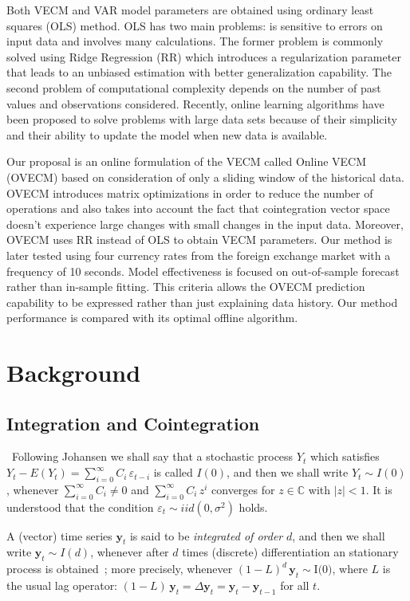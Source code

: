 \documentclass[twocolumn]{svjour3}          %
\begin{document}
Both VECM and VAR model parameters are obtained using ordinary least squares
(OLS) method. OLS has two main problems: is sensitive to errors on input data
and involves many calculations. The former problem is commonly solved using
Ridge Regression (RR) \cite{hoerl1970} which introduces a regularization
parameter that leads to an unbiased estimation with better generalization
capability. The second problem of computational complexity depends on the number
of past values and observations considered.  Recently, online learning
algorithms have been proposed to solve problems with large data sets because of
their simplicity and their ability to update the model when new data is
available. 

Our proposal is an online formulation of the VECM called Online VECM (OVECM)
based on consideration of only a sliding window of the historical data.  OVECM
introduces matrix optimizations in order to reduce the number of operations and
also takes into account the fact that cointegration vector space doesn't
experience large changes with small changes in the input data. Moreover, OVECM
uses RR instead of OLS to obtain VECM parameters. Our method is later tested using four
currency rates from the foreign exchange market with a frequency of 10 seconds.
Model effectiveness is focused on out-of-sample forecast rather than in-sample
fitting.  This criteria allows the OVECM prediction capability to be expressed
rather than just explaining data history. Our method performance is compared
with its optimal offline algorithm.

\section{Background}
\label{sec:background}
\subsection{Integration and Cointegration}\label{sec:coint}\  
Following Johansen \cite{johansen1995} we shall say that a stochastic process
$Y_t$ which satisfies $Y_t-E(Y_t) = \sum_{i=0}^\infty C_i\,\varepsilon_{t-i}$ is
called $I(0)$, and then we shall write $Y_t\sim I(0)$, whenever
$\sum_{i=0}^\infty C_i \neq 0$ and $\sum_{i=0}^\infty C_i\,z^i$ converges for
$z\in\mathbb{C}$ with $|z|<1$.  It is understood that the condition
$\varepsilon_t\sim iid(0,\sigma^2)$ holds.

A (vector) time series $\mathbf{y}_t$ is said to be {\em integrated of order\/}
$d$, and then we shall write $\mathbf{y}_t\sim I(d)$, whenever after $d$ times
(discrete) differentiation an stationary process is obtained~\cite{banerjee1993};
more precisely, whenever
$(1-L)^d\,\mathbf{y}_t\sim\text{I(0)}$, where $L$ is the usual lag operator:
$(1-L)\,\mathbf{y}_t = \Delta\mathbf{y}_t = \mathbf{y}_t-\mathbf{y}_{t-1}$ for
all $t$.  
\end{document}

